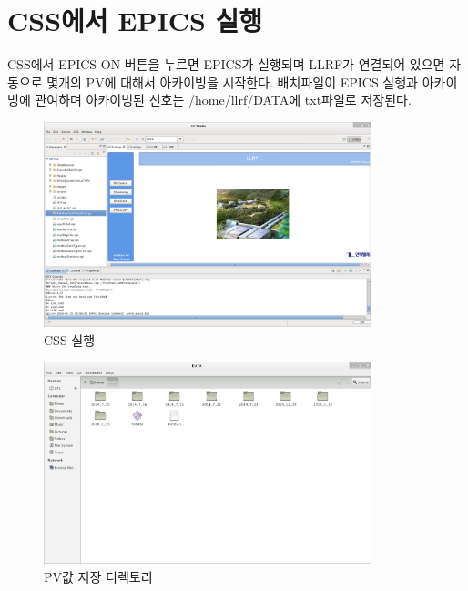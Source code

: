 \documentclass[11pt
  , a4paper
  , article
  , oneside
]{memoir}
\begin{document}
\section{CSS에서 EPICS 실행}
CSS에서 EPICS ON 버튼을 누르면 EPICS가 실행되며 LLRF가 연결되어 있으면 자동으로 몇개의 PV에 대해서 아카이빙을 시작한다. 배치파일이 EPICS 실행과 아카이빙에 관여하며 아카이빙된 신호는 /home/llrf/DATA에 txt파일로 저장된다.
\begin{figure}[h!]
	\centering
	\includegraphics[width=0.85\textwidth, height=0.6\textwidth]{./images/5.png}
	\caption{CSS 실행}
\end{figure}
\begin{figure}[h!]
	\centering
	\includegraphics[width=0.85\textwidth, height=0.6\textwidth]{./images/6.png}
	\caption{PV값 저장 디렉토리}
\end{figure}
\end{document}
